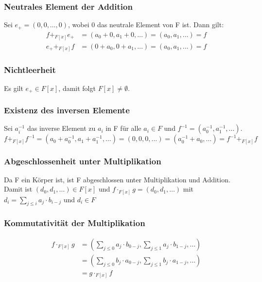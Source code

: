 \documentclass[12pt, german]{article}
\begin{document}
\begin{enumerate}[label=\alph*)]
    \subsubsection*{Neutrales Element der Addition}
    Sei $e_+=(0,0,\ldots,0)$, wobei 0 das neutrale Element von F ist. Dann gilt: \\
    \begin{align*}
    	f +_{F[x]} e_+ &= (a_0+0,a_1+0,\ldots)=(a_0,a_1,\ldots)=f\\
    	e_+ +_{F[x]} f  &= (0+a_0,0+a_1,\ldots)=(a_0,a_1,\ldots)=f
    \end{align*}
   	
   	\subsubsection*{Nichtleerheit}
    Es gilt $e_+ \in F[x]$, damit folgt $F[x]\neq\emptyset$.
	
	\subsubsection*{Existenz des inversen Elemente}
    Sei $a_i^{-1}$ das inverse Element zu $a_i$ in F für alle $a_i \in F$ und $f^{-1}=(a_0^{-1},a_1^{-1},\ldots)$.\\
    $$f +_{F[x]} f^{-1} = (a_0+a_0^{-1},a_1+a_1^{-1},\ldots)=(0,0,0,\ldots)=(a_0^{-1}+a_0,\ldots)=f^{-1} +_{F[x]} f$$
  	
  	\subsubsection*{Abgeschlossenheit unter Multiplikation}
  	Da F ein Körper ist, ist F abgeschlossen unter Multiplikation und Addition. Damit ist $(d_0,d_1,\ldots)\in F[x]$ und 
    $f \cdot_{F[x]} g = (d_0,d_1,\ldots)$ mit $d_i=\sum_{j\leq i}{a_j\cdot b_{i-j}}$ und $d_i \in F$
   	
   	\subsubsection*{Kommutativität der Multiplikation}
    \begin{align*}
    	f \cdot_{F[x]} g &= (\sum_{j\leq 0}{a_j\cdot b_{0-j}},\sum_{j\leq 1}{a_j\cdot b_{1-j}},\ldots) \\
    	&= (\sum_{j\leq 0}{b_j\cdot a_{0-j}},\sum_{j\leq 1}{b_j\cdot a_{1-j}},\ldots) \\
    	&=g \cdot_{F[x]} f
    	 \end{align*}
    

\end{enumerate}
\end{document}
